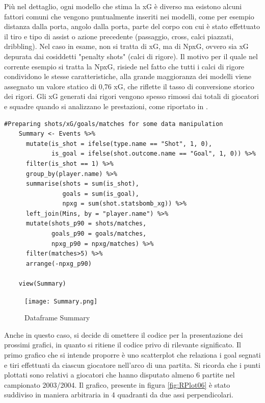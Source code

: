             Più nel dettaglio, ogni modello che stima la xG è diverso ma esistono alcuni fattori comuni che vengono puntualmente inseriti nei modelli, come per esempio distanza dalla porta, angolo dalla porta, parte del corpo con cui è stato effettuato il tiro e tipo di assist o azione precedente (passaggio, cross, calci piazzati, dribbling). Nel caso in esame, non si tratta di xG, ma di NpxG, ovvero sia xG depurata dai cosiddetti "penalty shots" (calci di rigore). Il motivo per il quale nel corrente esempio si tratta la NpxG, risiede nel fatto che tutti i calci di rigore condividono le stesse caratteristiche, alla grande maggioranza dei modelli viene assegnato un valore statico di 0,76 xG, che riflette il tasso di conversione storico dei rigori. Gli xG generati dai rigori vengono spesso rimossi dai totali di giocatori e squadre quando si analizzano le prestazioni, come riportato in \cite{xG}.

            \vspace{10pt}

            \begin{lstlisting}[numbers=None]
    #Preparing shots/xG/goals/matches for some data manipulation
    Summary <- Events %>% 
      mutate(is_shot = ifelse(type.name == "Shot", 1, 0),
             is_goal = ifelse(shot.outcome.name == "Goal", 1, 0)) %>% 
      filter(is_shot == 1) %>% 
      group_by(player.name) %>% 
      summarise(shots = sum(is_shot),
                goals = sum(is_goal),
                npxg = sum(shot.statsbomb_xg)) %>% 
      left_join(Mins, by = "player.name") %>%
      mutate(shots_p90 = shots/matches,
             goals_p90 = goals/matches,
             npxg_p90 = npxg/matches) %>%
      filter(matches>5) %>% 
      arrange(-npxg_p90)
      
    view(Summary)
            \end{lstlisting}

            \vspace{10pt}
            
            \begin{figure}[h]
                \texttt{[image: Summary.png]}
                \centering
                \caption{Dataframe Summary}
                \label{fig:Summary}
            \end{figure}

            \vspace{10pt}

            Anche in questo caso, si decide di omettere il codice per la presentazione dei prossimi grafici, in quanto si ritiene il codice privo di rilevante significato. Il primo grafico che si intende proporre è uno scatterplot che relaziona i goal segnati e tiri effettuati da ciascun giocatore nell'arco di una partita. Si ricorda che i punti plottati sono relativi a giocatori che hanno disputato almeno 6 partite nel campionato 2003/2004. Il grafico, presente in figura \ref{fig:RPlot06} è stato suddiviso in maniera arbitraria in 4 quadranti da due assi perpendicolari. 
            
